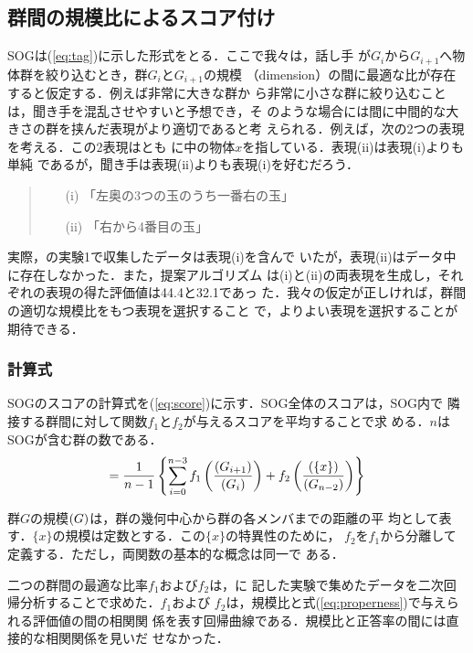 \documentclass{nlp}
\begin{document}
\subsection{群間の規模比によるスコア付け}
SOGは(\ref{eq:tag})に示した形式をとる．ここで我々は，話し手
が$G_i$から$G_{i+1}$へ物体群を絞り込むとき，群$G_{i}$と$G_{i+1}$の規模
（dimension）の間に最適な比が存在すると仮定する．例えば非常に大きな群か
ら非常に小さな群に絞り込むことは，聞き手を混乱させやすいと予想でき，そ
のような場合には間に中間的な大きさの群を挟んだ表現がより適切であると考
えられる．例えば，次の2つの表現を考える．この2表現はとも
に中の物体$x$を指している．表現(ii)は表現(i)よりも単純
であるが，聞き手は表現(ii)よりも表現(i)を好むだろう．

\begin{quote}
\begin{itemize}
\item[(i)] 「左奥の3つの玉のうち一番右の玉」
\item[(ii)] 「右から4番目の玉」
\end{itemize}
\end{quote}

実際，の実験1で収集したデータは表現(i)を含んで
いたが，表現(ii)はデータ中に存在しなかった．また，提案アルゴリズム
は(i)と(ii)の両表現を生成し，それぞれの表現の得た評価値は44.4と32.1であっ
た．我々の仮定が正しければ，群間の適切な規模比をもつ表現を選択すること
で，よりよい表現を選択することが期待できる．

\subsubsection*{計算式}
SOGのスコアの計算式を(\ref{eq:score})に示す．SOG全体のスコアは，SOG内で
隣接する群間に対して関数$f_1$と$f_2$が与えるスコアを平均することで求
める．$n$はSOGが含む群の数である．
\begin{equation}
  \mi{score(SOG)}= \frac{1}{n-1}\left\{ \sum^{n-3}_{i=0}
  f_1\left(\frac{\mi{dim}(G_{i+1})}{\mi{dim}(G_{i})}\right)
  +f_2\left(\frac{\mi{dim}(\{x\})}{\mi{dim}(G_{n-2})}\right)\right\} \label{eq:score}
\end{equation}

群$G$の規模$\mi{dim}(G)$は，群の幾何中心から群の各メンバまでの距離の平
均として表す．$\{x\}$の規模は定数とする．この$\{x\}$の特異性のために，
$f_2$を$f_1$から分離して定義する．ただし，両関数の基本的な概念は同一で
ある．

二つの群間の最適な比率$f_1$および$f_2$は，に
記した実験で集めたデータを二次回帰分析することで求めた．$f_1$および
$f_2$は，規模比と式(\ref{eq:properness})で与えられる評価値の間の相関関
係を表す回帰曲線である．規模比と正答率の間には直接的な相関関係を見いだ
せなかった．
\end{document}
